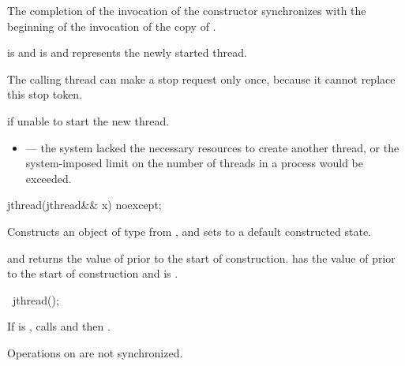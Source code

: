 \begin{itemdescr}
\pnum
\sync The completion of the invocation of the constructor
synchronizes with the beginning of the invocation of the copy of .

\pnum\ensures
{} is 
and  is 
and  represents the newly started thread.
\begin{note}
The calling thread can make a stop request only once,
because it cannot replace this stop token.
\end{note}

\pnum\throws {} if unable to start the new thread.

\pnum
\errors
\begin{itemize}
\item {} --- the system lacked
the necessary resources to create another thread,
or the system-imposed limit on the number of threads in a process
would be exceeded.
\end{itemize}
\end{itemdescr}

%
\begin{itemdecl}
jthread(jthread&& x) noexcept;
\end{itemdecl}

\begin{itemdescr}
\pnum
\effects Constructs an object of type  from , and sets
 to a default constructed state.

\pnum
\ensures
{}
and  returns the value of 
prior to the start of construction.
 has the value of 
prior to the start of construction
and  is .
\end{itemdescr}

%
\begin{itemdecl}
~jthread();
\end{itemdecl}

\begin{itemdescr}
\pnum
\effects
If  is ,
calls  and then .
\begin{note} Operations on  are not synchronized. \end{note}
\end{itemdescr}


